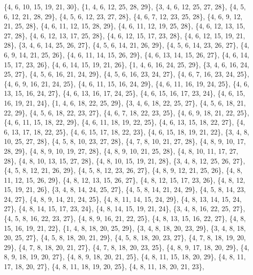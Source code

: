 \documentclass[11pt,a4paper]{article}
\begin{document}
{\{4, 6, 10, 15, 19, 21, 30\}, \{1, 4, 6, 12, 25, 28, 29\}, \{3, 4, 6, 12, 25, 27, 28\}, \{4, 5, 6, 12, 21, 28, 29\}, \{4, 5, 6, 12, 23, 27, 28\},
\{4, 6, 7, 12, 23, 25, 28\}, \{4, 6, 9, 12, 21, 25, 28\}, \{4, 6, 11, 12, 15, 28, 29\}, \{4, 6, 11, 12, 19, 25, 28\}, \{4, 6, 12, 13, 15, 27, 28\},
\{4, 6, 12, 13, 17, 25, 28\}, \{4, 6, 12, 15, 17, 23, 28\}, \{4, 6, 12, 15, 19, 21, 28\}, \{3, 4, 6, 14, 25, 26, 27\}, \{4, 5, 6, 14, 21, 26, 29\},
\{4, 5, 6, 14, 23, 26, 27\}, \{4, 6, 9, 14, 21, 25, 26\}, \{4, 6, 11, 14, 15, 26, 29\}, \{4, 6, 13, 14, 15, 26, 27\}, \{4, 6, 14, 15, 17, 23, 26\},
\{4, 6, 14, 15, 19, 21, 26\}, \{1, 4, 6, 16, 24, 25, 29\}, \{3, 4, 6, 16, 24, 25, 27\}, \{4, 5, 6, 16, 21, 24, 29\}, \{4, 5, 6, 16, 23, 24, 27\},
\{4, 6, 7, 16, 23, 24, 25\}, \{4, 6, 9, 16, 21, 24, 25\}, \{4, 6, 11, 15, 16, 24, 29\}, \{4, 6, 11, 16, 19, 24, 25\}, \{4, 6, 13, 15, 16, 24, 27\},
\{4, 6, 13, 16, 17, 24, 25\}, \{4, 6, 15, 16, 17, 23, 24\}, \{4, 6, 15, 16, 19, 21, 24\}, \{1, 4, 6, 18, 22, 25, 29\}, \{3, 4, 6, 18, 22, 25, 27\},
\{4, 5, 6, 18, 21, 22, 29\}, \{4, 5, 6, 18, 22, 23, 27\}, \{4, 6, 7, 18, 22, 23, 25\}, \{4, 6, 9, 18, 21, 22, 25\}, \{4, 6, 11, 15, 18, 22, 29\},
\{4, 6, 11, 18, 19, 22, 25\}, \{4, 6, 13, 15, 18, 22, 27\}, \{4, 6, 13, 17, 18, 22, 25\}, \{4, 6, 15, 17, 18, 22, 23\}, \{4, 6, 15, 18, 19, 21, 22\},
\{3, 4, 8, 10, 25, 27, 28\}, \{4, 5, 8, 10, 23, 27, 28\}, \{4, 7, 8, 10, 21, 27, 28\}, \{4, 8, 9, 10, 17, 28, 29\}, \{4, 8, 9, 10, 19, 27, 28\},
\{4, 8, 9, 10, 21, 25, 28\}, \{4, 8, 10, 11, 17, 27, 28\}, \{4, 8, 10, 13, 15, 27, 28\}, \{4, 8, 10, 15, 19, 21, 28\}, \{3, 4, 8, 12, 25, 26, 27\},
\{4, 5, 8, 12, 21, 26, 29\}, \{4, 5, 8, 12, 23, 26, 27\}, \{4, 8, 9, 12, 21, 25, 26\}, \{4, 8, 11, 12, 15, 26, 29\}, \{4, 8, 12, 13, 15, 26, 27\},
\{4, 8, 12, 15, 17, 23, 26\}, \{4, 8, 12, 15, 19, 21, 26\}, \{3, 4, 8, 14, 24, 25, 27\}, \{4, 5, 8, 14, 21, 24, 29\}, \{4, 5, 8, 14, 23, 24, 27\},
\{4, 8, 9, 14, 21, 24, 25\}, \{4, 8, 11, 14, 15, 24, 29\}, \{4, 8, 13, 14, 15, 24, 27\}, \{4, 8, 14, 15, 17, 23, 24\}, \{4, 8, 14, 15, 19, 21, 24\},
\{3, 4, 8, 16, 22, 25, 27\}, \{4, 5, 8, 16, 22, 23, 27\}, \{4, 8, 9, 16, 21, 22, 25\}, \{4, 8, 13, 15, 16, 22, 27\}, \{4, 8, 15, 16, 19, 21, 22\},
\{1, 4, 8, 18, 20, 25, 29\}, \{3, 4, 8, 18, 20, 23, 29\}, \{3, 4, 8, 18, 20, 25, 27\}, \{4, 5, 8, 18, 20, 21, 29\}, \{4, 5, 8, 18, 20, 23, 27\},
\{4, 7, 8, 18, 19, 20, 29\}, \{4, 7, 8, 18, 20, 21, 27\}, \{4, 7, 8, 18, 20, 23, 25\}, \{4, 8, 9, 17, 18, 20, 29\}, \{4, 8, 9, 18, 19, 20, 27\},
\{4, 8, 9, 18, 20, 21, 25\}, \{4, 8, 11, 15, 18, 20, 29\}, \{4, 8, 11, 17, 18, 20, 27\}, \{4, 8, 11, 18, 19, 20, 25\}, \{4, 8, 11, 18, 20, 21, 23\},
}
\end{document}
